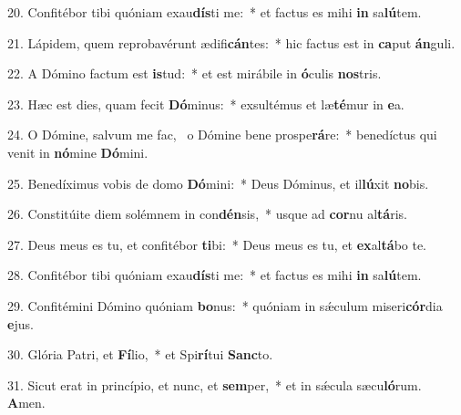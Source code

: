 20. Confitébor tibi quóniam exau\textbf{dís}ti me:~*  et factus es mihi \textbf{in} sa\textbf{lú}tem.\

21. Lápidem, quem reprobavérunt ædifi\textbf{cán}tes:~*  hic factus est in \textbf{ca}put \textbf{án}guli.\

22. A Dómino factum est \textbf{is}tud:~*  et est mirábile in \textbf{ó}culis \textbf{nos}tris.\

23. Hæc est dies, quam fecit \textbf{Dó}minus:~*  exsultémus et læ\textbf{té}mur in \textbf{e}a.\

24. O Dómine, salvum me fac, \dag\  o Dómine bene prospe\textbf{rá}re:~*  benedíctus qui venit in \textbf{nó}mine \textbf{Dó}mini.\

25. Benedíximus vobis de domo \textbf{Dó}mini:~*  Deus Dóminus, et il\textbf{lú}xit \textbf{no}bis.\

26. Constitúite diem solémnem in con\textbf{dén}sis,~*  usque ad \textbf{cor}nu al\textbf{tá}ris.\

27. Deus meus es tu, et confitébor \textbf{ti}bi:~*  Deus meus es tu, et \textbf{ex}al\textbf{tá}bo te.\

28. Confitébor tibi quóniam exau\textbf{dís}ti me:~*  et factus es mihi \textbf{in} sa\textbf{lú}tem.\

29. Confitémini Dómino quóniam \textbf{bo}nus:~*  quóniam in sǽculum miseri\textbf{cór}dia \textbf{e}jus.\

30. Glória Patri, et \textbf{Fí}lio,~*  et Spi\textbf{rí}tui \textbf{Sanc}to.\

31. Sicut erat in princípio, et nunc, et \textbf{sem}per,~*  et in sǽcula sæcu\textbf{ló}rum. \textbf{A}men.\

